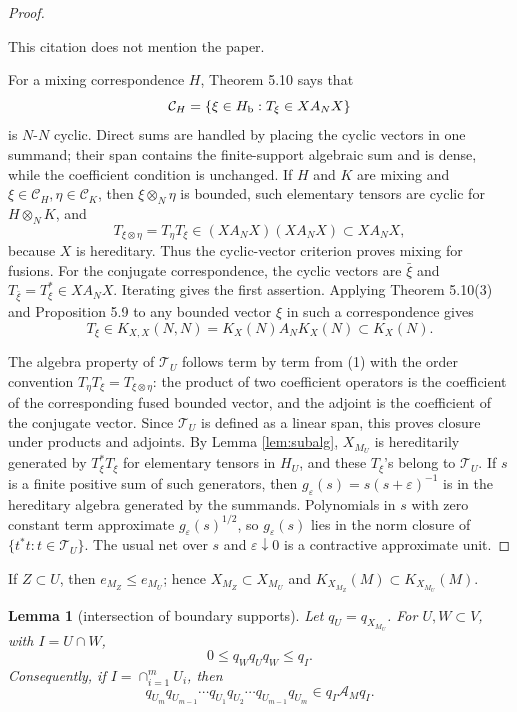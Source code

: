 \documentclass[12pt]{article}
\newtheorem{lemma}{Lemma}
\newcommand{\cA}{\mathcal A}
\newcommand{\cT}{\mathcal T}
\newcommand{\review}[1]{\begin{reviewbox}#1\end{reviewbox}}
\begin{document}
\begin{proof}
\review{This citation does not mention the paper.}
For a mixing correspondence \(H\), Theorem 5.10 says that
\[
  \mathcal C_H=\{\xi\in H_{\rm b}: T_\xi\in X A_N X\}
\]
is \(N\)-\(N\) cyclic.  Direct sums are handled by placing the cyclic vectors
in one summand; their span contains the finite-support algebraic sum and is
dense, while the coefficient condition is unchanged.  If \(H\) and \(K\) are
mixing and \(\xi\in\mathcal C_H,\eta\in\mathcal C_K\), then \(\xi\otimes_N\eta\)
is bounded, such elementary tensors are cyclic for \(H\otimes_NK\), and
\[
        T_{\xi\otimes\eta}=T_\eta T_\xi\in (X A_N X)(X A_N X)\subset X A_N X,
\]
because \(X\) is hereditary.  Thus the cyclic-vector criterion proves mixing
for fusions.  For the conjugate correspondence, the cyclic vectors are
\(\bar\xi\) and \(T_{\bar\xi}=T_\xi^*\in X A_NX\).  Iterating gives the first
assertion.  Applying Theorem 5.10(3) and Proposition 5.9 to any bounded vector
\(\xi\) in such a correspondence gives
\[
        T_\xi\in K_{X,X}(N,N)=K_X(N)A_NK_X(N)\subset K_X(N).
\]

The algebra property of \(\cT_U\) follows term by term from (1) with the order
convention \(T_\eta T_\xi=T_{\xi\otimes\eta}\): the product of two coefficient
operators is the coefficient of the corresponding fused bounded vector, and the
adjoint is the coefficient of the conjugate vector.  Since \(\cT_U\) is defined
as a linear span, this proves closure under products and adjoints.  By Lemma
\ref{lem:subalg}, \(X_{M_U}\) is hereditarily generated
by \(T_\xi^*T_\xi\) for elementary tensors in \(H_U\), and these \(T_\xi\)'s
belong to \(\cT_U\).  If \(s\) is a finite positive sum of such generators,
then \(g_\varepsilon(s)=s(s+\varepsilon)^{-1}\) is in the hereditary algebra
generated by the summands.  Polynomials in \(s\) with zero constant term
approximate \(g_\varepsilon(s)^{1/2}\), so \(g_\varepsilon(s)\) lies in the
norm closure of \(\{t^*t:t\in\cT_U\}\).  The usual net over \(s\) and
\(\varepsilon\downarrow0\) is a contractive approximate unit.
\end{proof}

If \(Z\subset U\), then \(e_{M_Z}\le e_{M_U}\); hence
\(X_{M_Z}\subset X_{M_U}\) and \(K_{X_{M_Z}}(M)\subset K_{X_{M_U}}(M)\).

\begin{lemma}[intersection of boundary supports]\label{lem:intersection}
Let \(q_U=q_{X_{M_U}}\).  For \(U,W\subset V\), with \(I=U\cap W\),
\[
        0\le q_Wq_Uq_W\le q_I .
\]
Consequently, if \(I=\cap_{i=1}^m U_i\), then
\[
q_{U_m}q_{U_{m-1}}\cdots q_{U_1}q_{U_2}\cdots q_{U_{m-1}}q_{U_m}
   \in q_I\cA_Mq_I .
\]
\end{lemma}
\end{document}

